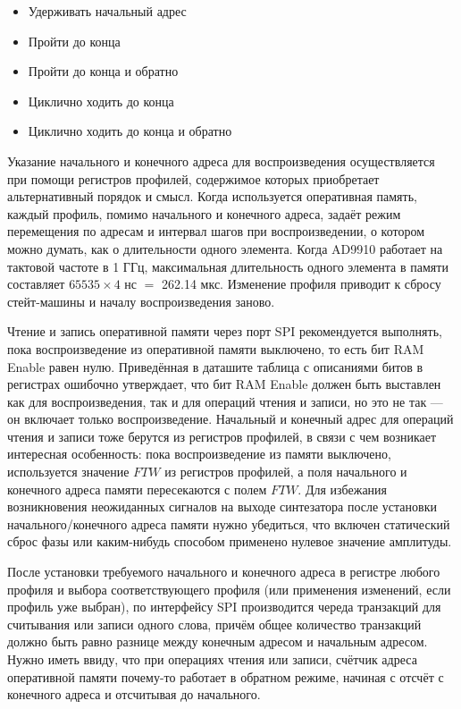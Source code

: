 \documentclass[rusmathsym, eqnumwithinsec, amspack, hyperref]{bomgost}
\begin{document}
\begin{itemize}
	\item Удерживать начальный адрес
	\item Пройти до конца
	\item Пройти до конца и обратно
	\item Циклично ходить до конца 
	\item Циклично ходить до конца и обратно
\end{itemize}

Указание начального и конечного адреса для воспроизведения осуществляется при помощи регистров профилей, содержимое которых приобретает альтернативный порядок и смысл. Когда используется оперативная память, каждый профиль, помимо начального и конечного адреса, задаёт режим перемещения по адресам и интервал шагов при воспроизведении, о котором можно думать, как о длительности одного элемента. Когда AD9910 работает на тактовой частоте в 1 ГГц, максимальная длительность одного элемента в памяти составляет $65535\times4$ нс $=$ 262.14 мкс. Изменение профиля приводит к сбросу стейт-машины и началу воспроизведения заново.

Чтение и запись оперативной памяти через порт SPI рекомендуется выполнять, пока воспроизведение из оперативной памяти выключено, то есть бит RAM Enable равен нулю. Приведённая в даташите таблица с описаниями битов в регистрах ошибочно утверждает, что бит RAM Enable должен быть выставлен как для воспроизведения, так и для операций чтения и записи, но это не так --- он включает только воспроизведение. Начальный и конечный адрес для операций чтения и записи тоже берутся из регистров профилей, в связи с чем возникает интересная особенность: пока воспроизведение из памяти выключено, используется значение $FTW$ из регистров профилей, а поля начального и конечного адреса памяти пересекаются с полем $FTW$. Для избежания возникновения неожиданных сигналов на выходе синтезатора после установки начального/конечного адреса памяти нужно убедиться, что включен статический сброс фазы или каким-нибудь способом применено нулевое значение амплитуды.

После установки требуемого начального и конечного адреса в регистре любого профиля и выбора соответствующего профиля (или применения изменений, если профиль уже выбран), по интерфейсу SPI производится череда транзакций для считывания или записи одного слова, причём общее количество транзакций должно быть равно разнице между конечным адресом и начальным адресом. Нужно иметь ввиду, что при операциях чтения или записи, счётчик адреса оперативной памяти почему-то работает в обратном режиме, начиная с отсчёт с конечного адреса и отсчитывая до начального.
\end{document}
